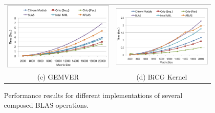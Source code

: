 \documentclass[runningheads]{llncs}
\begin{document}
\begin{figure}[htp]
{\begin{tabular}{cc}
\begin{minipage}[b]{.5\textwidth}
\includegraphics[width=\textwidth]{figures/gemver.png}
\end{minipage}
&
\begin{minipage}[b]{.5\textwidth}
\includegraphics[width=\textwidth]{figures/bicgkernel.png}
\end{minipage}\\

(c) GEMVER & (d) BiCG Kernel \\

\end{tabular}
}
\caption{Performance results for different implementations of several composed BLAS operations.}
\label{fig:results}
\end{figure}
\end{document}

